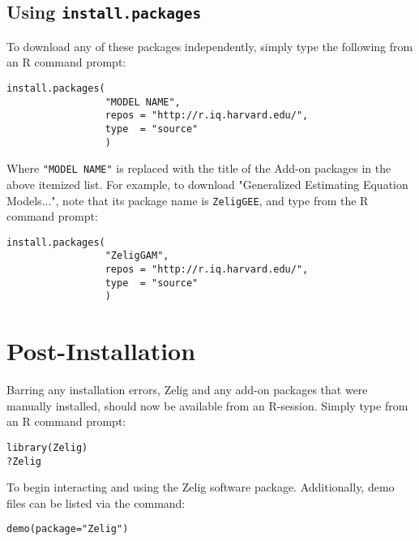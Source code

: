 \subsection{Using {\tt install.packages}}
\begin{minipage}{\linewidth}
To download any of these packages independently, simply type the following from an R command prompt:
\begin{verbatim}
install.packages(
                 "MODEL NAME",
                 repos = "http://r.iq.harvard.edu/",
                 type  = "source"
                 )
\end{verbatim}

Where {\tt "MODEL NAME"} is replaced with the title of the Add-on packages in the above itemized list. For example, to download "Generalized Estimating Equation Models...", note that its package name is {\tt ZeligGEE}, and type from the R command prompt:
\begin{verbatim}
install.packages(
                 "ZeligGAM",
                 repos = "http://r.iq.harvard.edu/",
                 type  = "source"
                 )
\end{verbatim}
\end{minipage}

%



\section{Post-Installation}

Barring any installation errors, Zelig and any add-on packages that were manually installed, should now be available from an R-session. Simply type from an R command prompt:

\begin{verbatim}
library(Zelig)
?Zelig
\end{verbatim}

To begin interacting and using the Zelig software package. Additionally, demo files can be listed via the command:

\begin{verbatim}
demo(package="Zelig")
\end{verbatim}








